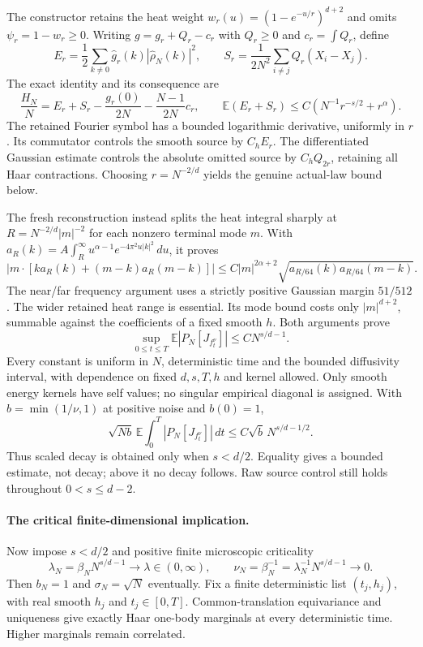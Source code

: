 \documentclass[10pt]{article}
\newcommand{\E}{\mathbb E}
\begin{document}
The constructor retains the heat weight
$w_r(u)=(1-e^{-u/r})^{d+2}$ and omits $\psi_r=1-w_r\ge0$.
Writing $g=g_r+Q_r-c_r$ with $Q_r\ge0$ and $c_r=\int Q_r$, define
\[
 E_r=\frac12\sum_{k\ne0}\widehat g_r(k)|\widehat\rho_N(k)|^2,
 \qquad S_r=\frac1{2N^2}\sum_{i\ne j}Q_r(X_i-X_j).
\]
The exact identity and its consequence are
\[
 \frac{H_N}{N}=E_r+S_r-\frac{g_r(0)}{2N}-\frac{N-1}{2N}c_r,
 \qquad \E(E_r+S_r)\le C(N^{-1}r^{-s/2}+r^\alpha).
\]
The retained Fourier symbol has a bounded logarithmic derivative, uniformly in $r$. Its commutator controls the smooth source by $C_hE_r$. The differentiated Gaussian estimate controls the absolute omitted source by $C_hQ_{2r}$, retaining all Haar contractions. Choosing $r=N^{-2/d}$ yields the genuine actual-law bound below.

The fresh reconstruction instead splits the heat integral sharply at
$R=N^{-2/d}|m|^{-2}$ for each nonzero terminal mode $m$. With
$a_R(k)=A\int_R^\infty u^{\alpha-1}e^{-4\pi^2u|k|^2}\,du$, it proves
\[
 |m\cdot[k a_R(k)+(m-k)a_R(m-k)]|
 \le C|m|^{2\alpha+2}\sqrt{a_{R/64}(k)a_{R/64}(m-k)}.
\]
The near/far frequency argument uses a strictly positive Gaussian margin $51/512$. The wider retained heat range is essential. Its mode bound costs only $|m|^{d+2}$, summable against the coefficients of a fixed smooth $h$. Both arguments prove
\[
 \boxed{\sup_{0\le t\le T}\E|P_N[J_{f_t^\nu}]|\le C N^{s/d-1}.}
\]
Every constant is uniform in $N$, deterministic time and the bounded diffusivity interval, with dependence on fixed $d,s,T,h$ and kernel allowed. Only smooth energy kernels have self values; no singular empirical diagonal is assigned. With $b=\min(1/\nu,1)$ at positive noise and $b(0)=1$,
\[
 \sqrt{Nb}\,\E\int_0^T|P_N[J_{f_t^\nu}]|\,dt
 \le C\sqrt b\,N^{s/d-1/2}.
\]
Thus scaled decay is obtained only when $s<d/2$. Equality gives a bounded estimate, not decay; above it no decay follows. Raw source control still holds throughout $0<s\le d-2$.

\paragraph{The critical finite-dimensional implication.}
Now impose $s<d/2$ and positive finite microscopic criticality
\[
 \lambda_N=\beta_NN^{s/d-1}\longrightarrow\lambda\in(0,\infty),
 \qquad \nu_N=\beta_N^{-1}=\lambda_N^{-1}N^{s/d-1}\longrightarrow0.
\]
Then $b_N=1$ and $\sigma_N=\sqrt N$ eventually. Fix a finite deterministic list $(t_j,h_j)$, with real smooth $h_j$ and $t_j\in[0,T]$. Common-translation equivariance and uniqueness give exactly Haar one-body marginals at every deterministic time. Higher marginals remain correlated.
\end{document}
